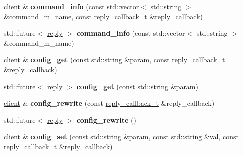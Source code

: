 \begin{DoxyCompactItemize}
\item 
\mbox{\label{classcpp__redis_1_1client_a95105c556aa5c070819bc82729d336c5}} 
\mbox{\hyperlink{classcpp__redis_1_1client}{client}} \& {\bfseries command\+\_\+info} (const std\+::vector$<$ std\+::string $>$ \&command\+\_\+m_name, const \mbox{\hyperlink{classcpp__redis_1_1client_af7a65eb21aa25230bfbb0b0203c4fc04}{reply\+\_\+callback\+\_\+t}} \&reply\+\_\+callback)
\item 
\mbox{\label{classcpp__redis_1_1client_abd02a4d296ed0c160e935cd176862334}} 
std\+::future$<$ \mbox{\hyperlink{classcpp__redis_1_1reply}{reply}} $>$ {\bfseries command\+\_\+info} (const std\+::vector$<$ std\+::string $>$ \&command\+\_\+m_name)
\item 
\mbox{\label{classcpp__redis_1_1client_a510ede75cc6361f33a4cdd0695f7543f}} 
\mbox{\hyperlink{classcpp__redis_1_1client}{client}} \& {\bfseries config\+\_\+get} (const std\+::string \&param, const \mbox{\hyperlink{classcpp__redis_1_1client_af7a65eb21aa25230bfbb0b0203c4fc04}{reply\+\_\+callback\+\_\+t}} \&reply\+\_\+callback)
\item 
\mbox{\label{classcpp__redis_1_1client_a221b1e414a4b1bb4eb2a7afaac0eb39d}} 
std\+::future$<$ \mbox{\hyperlink{classcpp__redis_1_1reply}{reply}} $>$ {\bfseries config\+\_\+get} (const std\+::string \&param)
\item 
\mbox{\label{classcpp__redis_1_1client_a8dcf862a8a0cb75f8cc986445eae81cf}} 
\mbox{\hyperlink{classcpp__redis_1_1client}{client}} \& {\bfseries config\+\_\+rewrite} (const \mbox{\hyperlink{classcpp__redis_1_1client_af7a65eb21aa25230bfbb0b0203c4fc04}{reply\+\_\+callback\+\_\+t}} \&reply\+\_\+callback)
\item 
\mbox{\label{classcpp__redis_1_1client_a1a001663bd555abb70521924ec2a27f8}} 
std\+::future$<$ \mbox{\hyperlink{classcpp__redis_1_1reply}{reply}} $>$ {\bfseries config\+\_\+rewrite} ()
\item 
\mbox{\label{classcpp__redis_1_1client_a0cff7147cd982a39cc84f91243a27364}} 
\mbox{\hyperlink{classcpp__redis_1_1client}{client}} \& {\bfseries config\+\_\+set} (const std\+::string \&param, const std\+::string \&val, const \mbox{\hyperlink{classcpp__redis_1_1client_af7a65eb21aa25230bfbb0b0203c4fc04}{reply\+\_\+callback\+\_\+t}} \&reply\+\_\+callback)

\end{DoxyCompactItemize}
